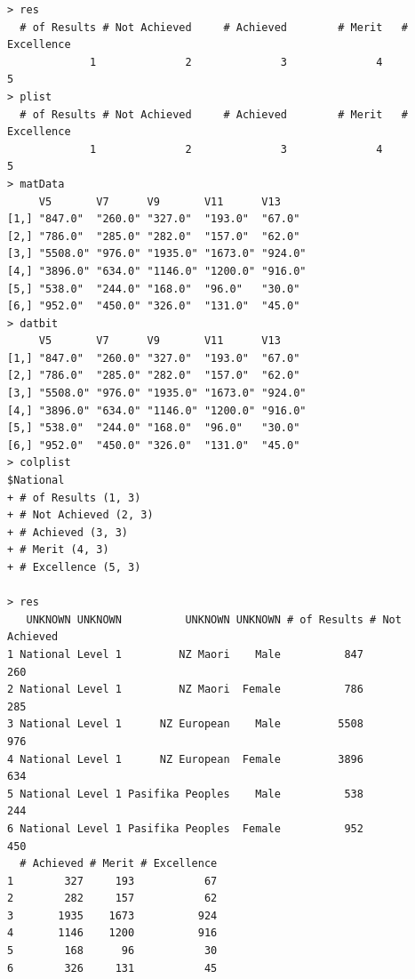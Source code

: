 \documentclass[a4paper]{article}
\begin{document}
\begin{verbatim}
> res 
  # of Results # Not Achieved     # Achieved        # Merit   # Excellence 
             1              2              3              4              5 
> plist 
  # of Results # Not Achieved     # Achieved        # Merit   # Excellence 
             1              2              3              4              5 
> matData 
     V5       V7      V9       V11      V13    
[1,] "847.0"  "260.0" "327.0"  "193.0"  "67.0" 
[2,] "786.0"  "285.0" "282.0"  "157.0"  "62.0" 
[3,] "5508.0" "976.0" "1935.0" "1673.0" "924.0"
[4,] "3896.0" "634.0" "1146.0" "1200.0" "916.0"
[5,] "538.0"  "244.0" "168.0"  "96.0"   "30.0" 
[6,] "952.0"  "450.0" "326.0"  "131.0"  "45.0" 
> datbit 
     V5       V7      V9       V11      V13    
[1,] "847.0"  "260.0" "327.0"  "193.0"  "67.0" 
[2,] "786.0"  "285.0" "282.0"  "157.0"  "62.0" 
[3,] "5508.0" "976.0" "1935.0" "1673.0" "924.0"
[4,] "3896.0" "634.0" "1146.0" "1200.0" "916.0"
[5,] "538.0"  "244.0" "168.0"  "96.0"   "30.0" 
[6,] "952.0"  "450.0" "326.0"  "131.0"  "45.0" 
> colplist 
$National
+ # of Results (1, 3)
+ # Not Achieved (2, 3)
+ # Achieved (3, 3)
+ # Merit (4, 3)
+ # Excellence (5, 3)

> res 
   UNKNOWN UNKNOWN          UNKNOWN UNKNOWN # of Results # Not Achieved
1 National Level 1         NZ Maori    Male          847            260
2 National Level 1         NZ Maori  Female          786            285
3 National Level 1      NZ European    Male         5508            976
4 National Level 1      NZ European  Female         3896            634
5 National Level 1 Pasifika Peoples    Male          538            244
6 National Level 1 Pasifika Peoples  Female          952            450
  # Achieved # Merit # Excellence
1        327     193           67
2        282     157           62
3       1935    1673          924
4       1146    1200          916
5        168      96           30
6        326     131           45
\end{verbatim}

\newpage
\end{document}

